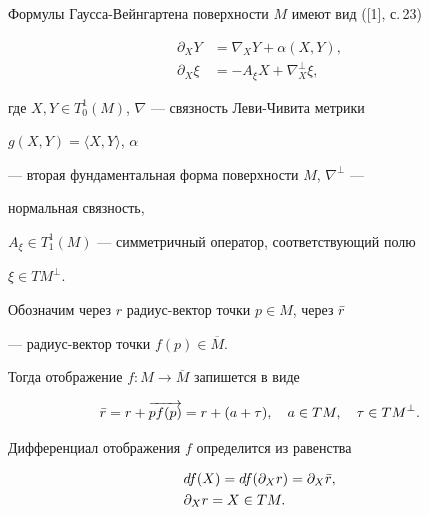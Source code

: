Формулы Гаусса-Вейнгартена поверхности $M$  имеют вид ([1], с.\,23)


\begin{equation}


\begin{split}


\partial_{X} Y &= \nabla_{X} Y +\alpha (X,Y),\\


\partial_{X} \xi &= - A_{\xi}X + \nabla _{X}^{\bot} \xi,


\end{split}


\end{equation}


где $X,Y \in T^1_0 (M)$, $\nabla $ --- связность Леви-Чивита метрики


$g(X,Y)=\langle X,Y\rangle$,  $\alpha$


--- вторая фундаментальная форма поверхности $M$, $\nabla ^{\bot}$ ---


нормальная связность,


$A_{\xi} \in T^1_1 (M)$ --- симметричный оператор, соответствующий полю


$\xi  \in TM ^{\bot}$.





Обозначим через $r$  радиус-вектор точки $p \in M$, через $\Bar{r}$


--- радиус-вектор точки $f(p) \in \overline  M$. 


Тогда отображение $f: M \to \overline M$  запишется в виде


\begin{equation}


\Bar{r}= r+\overrightarrow{pf(p)}= r+(a+\tau) ,\quad  a\in TM ,


\quad \tau \in{TM}^{\bot}.


\end{equation}





Дифференциал отображения $f$   определится из равенства


\begin{align*}


&df(X)= df(\partial _{X} r) = \partial _{X} \Bar{r},\\


&\partial _{X} r=   X \in TM.


\end{align*}





